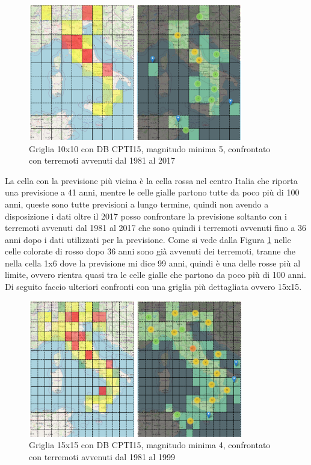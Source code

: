 \begin{figure}[H]
   \centering
   \includegraphics[width=0.835\textwidth]{images/10x10_mag5_confronto_36anniDopo_CPTI15.jpg}
   \caption{Griglia 10x10 con DB CPTI15, magnitudo minima 5, confrontato con terremoti avvenuti dal 1981 al 2017}
   \label{fig:10x10_mag5_36anniDopo}
\end{figure}

La cella con la previsione pi\`u vicina \`e la cella rossa nel centro Italia che riporta una previsione a 41 anni, mentre le celle gialle partono tutte da poco pi\`u di 100 anni, queste sono tutte previsioni a lungo termine, quindi non avendo a disposizione i dati oltre il 2017 posso confrontare la previsione soltanto con i terremoti avvenuti dal 1981 al 2017 che sono quindi i terremoti avvenuti fino a 36 anni dopo i dati utilizzati per la previsione. Come si vede dalla Figura \ref{fig:10x10_mag5_36anniDopo} nelle celle colorate di rosso dopo 36 anni sono gi\`a avvenuti dei terremoti, tranne che nella cella 1x6 dove la previsione mi dice 99 anni, quindi \`e una delle rosse pi\`u al limite, ovvero rientra quasi tra le celle gialle che partono da poco pi\`u di 100 anni.\\
Di seguito faccio ulteriori confronti con una griglia pi\`u dettagliata ovvero 15x15.

\begin{figure}[H]
   \centering
   \includegraphics[width=0.835\textwidth]{images/15x15_mag4_confronto_18anniDopo_CPTI15.jpg}
   \caption{Griglia 15x15 con DB CPTI15, magnitudo minima 4, confrontato con terremoti avvenuti dal 1981 al 1999}
   \label{fig:15x15_mag4_18anniDopo}
\end{figure}

